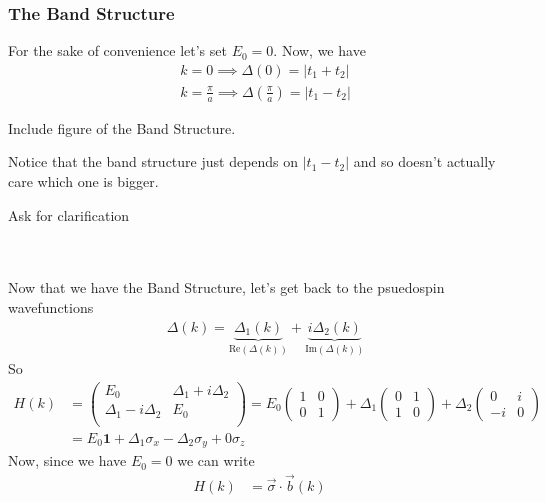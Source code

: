\documentclass[11pt]{article}
\begin{document}
\subsubsection*{The Band Structure}
For the sake of convenience let's set $E_0 = 0$. Now, we have 
\begin{align*}
  &k = 0 \implies \Delta(0) = |t_1 + t_2| \\
  &k = \frac{\pi}{a} \implies \Delta(\frac{\pi}{a}) = |t_1 - t_2| 
\end{align*}
\begin{center}
  Include figure of the Band Structure.
\end{center} Notice that the band structure just depends on $|t_1 - t_2|$ and so doesn't actually care which one is bigger. \begin{note}
  {Ask for clarification}
\end{note} \\
\\
Now that we have the Band Structure, let's get back to the psuedospin wavefunctions 
\begin{align*}
  &\Delta(k) = \underbrace{\Delta_1(k)}_{\mathrm{Re}(\Delta(k))} +  \underbrace{i\Delta_2(k)}_{\mathrm{Im}(\Delta(k))}
\end{align*} So 
\begin{align*}
  H(k) &= \begin{pmatrix}
    E_0 & \Delta_1 + i \Delta_2 \\
    \Delta_1 - i \Delta_2 & E_0 \\
  \end{pmatrix} = E_0 \begin{pmatrix}
    1 & 0 \\
    0 & 1
  \end{pmatrix} + \Delta_1 \begin{pmatrix}
    0 & 1 \\
    1 & 0
  \end{pmatrix} + \Delta_2 \begin{pmatrix}
    0 & i \\
    -i & 0
  \end{pmatrix} \\
  &= E_0 \mathbf{1} + \Delta_1 \sigma_x - \Delta_2 \sigma_{y} + 0 \sigma_z
\end{align*} Now, since we have $E_0 = 0$ we can write 
\begin{align*}
  H(k) &= \vec{\sigma} \cdot \vec{b}(k)
\end{align*}
\end{document}
